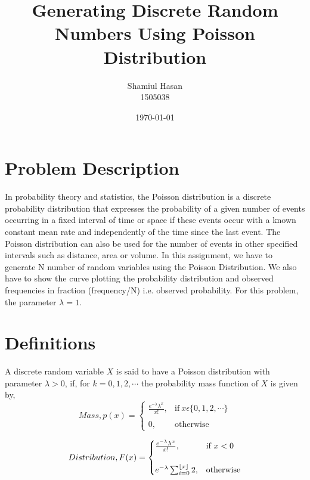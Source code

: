 \documentclass[12pt]{article}
\DeclarePairedDelimiter\floor{\lfloor}{\rfloor}
\begin{document}
\title{Generating Discrete Random Numbers Using Poisson Distribution}
\author{Shamiul Hasan\\1505038}
\date{\today}
\maketitle


\section{Problem Description}
In probability theory and statistics, the Poisson distribution is a discrete probability distribution that expresses the probability of a given number of events occurring in a fixed interval of time or space if these events occur with a known constant mean rate and independently of the time since the last event. The Poisson distribution can also be used for the number of events in other specified intervals such as distance, area or volume.
In this assignment, we have to generate N number of random variables using the Poisson Distribution. We also have to show the curve plotting the probability distribution and observed frequencies in fraction (frequency/N) i.e. observed probability. For this problem, the parameter $\lambda = 1$.


\section{Definitions}

A discrete random variable $X$ is said to have a Poisson distribution with parameter $\lambda > 0$, if, for $k = 0, 1, 2, \cdots$ the probability mass function of $X$ is given by, \\

\begin{equation}
	Mass, p(x)=
	\begin{cases}
		{\frac {e^{-\lambda}\lambda ^{x}}{x!}}, & \text{if}\ x \epsilon \{0,1,2,\cdots\} \\ \\
		0,                                      & \text{otherwise}
	\end{cases}
\end{equation}


\begin{equation}
	Distribution,F(x)=
	\begin{cases}
		{\frac {e^{-\lambda}\lambda ^{x}}{x!}}, & \text{if}\ x < 0 \\ \\
		e^{-\lambda}\sum_{i=0}^{\floor*{x}}2,   & \text{otherwise}
	\end{cases}
\end{equation}
\end{document}
